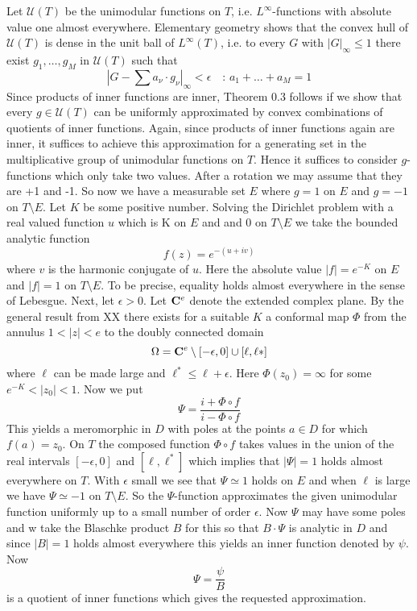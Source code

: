 \documentclass{amsart}
\def\vvv{-}
\begin{document}
\noindent
Let $\mathcal{U}(T)$
be the unimodular functions on $T$, i.e.
$L^\infty$-functions with absolute value one almost
everywhere.
Elementary geometry shows that the convex hull of
$\mathcal U(T)$ is dense in the unit ball of
$L^\infty(T)$, i.e. to every $G$ with
$|G|_\infty\leq 1$ there exist
$g_1,\ldots,g_M$ in $\mathcal{U}(T)$
such that
\[ 
|G-\sum a_\nu\cdot g_\nu|_\infty<\epsilon\quad\colon\, a_1+\ldots+a_M=1\tag{*}
\]
Since products of inner functions are inner, 
Theorem 0.3 follows if we  show that
every $g\in\mathcal{U}(T)$
can be uniformly approximated
by convex combinations of quotients of inner functions.
Again, since products of inner functions again are inner, it suffices to
achieve this approximation for a generating set in the
multiplicative group of  unimodular functions on $T$.
Hence it suffices to consider $g$-functions which only take two values. 
After a rotation
we may assume that they are +1 and -1. So now we have a measurable set
$E$ where $g=1$ on $E$ and $g=-1$ on $T\setminus E$.
Let $K$ be some positive number.
Solving the Dirichlet problem with a real valued function
$u$ which is K on $E$ and and 0 on $T\setminus E$
we take the bounded analytic function
\[ 
f(z)=e^{\vvv (u+iv)}
\]
where $v$ is the harmonic conjugate of $u$.
Here the absolute value $|f|=e^{\vvv K}$ on $E$ and $|f|=1$ on $T\setminus E$.
To be precise, equality holds almost everywhere in the
sense of Lebesgue.
Next, let $\epsilon>0$. Let ${\bf{C}}^e$
denote the extended complex plane. 
By the general result from XX
there exists for a suitable $K$
a conformal map
$\Phi$ from the annulus $1<|z|<e$
to the doubly connected domain
\[ 
\Omega={\bf{C}}^e\setminus [\vvv \epsilon,0]\cup
[\ell,\ell*]
\] 
where 
$\ell$ can be made large and $\ell^*\leq \ell+\epsilon$.
Here $\Phi(z_0)=\infty $  for some
$e^{\vvv K}<|z_0|<1$. Now we put
\[
\Psi=\frac{i+\Phi\circ f}{i\vvv\Phi\circ f}
\]
This yields a  meromorphic in $D$ with poles at the points $a\in D$ for which
$f(a)=z_0$.
On 
$T$ the composed function $\Phi\circ f$
takes values in the union of the real intervals
$[\vvv \epsilon,0]$ and $[\ell,\ell^*]$ which implies that
$|\Psi|=1$ holds almost everywhere on $T$.
With $\epsilon$ small we see that
$\Psi\simeq 1$ holds on
$E$ and when $\ell$ is large we have
$\Psi\simeq \vvv 1$ on $T\setminus E$.
So the $\Psi$\vvv function approximates the given unimodular 
function uniformly up to a small number of order $\epsilon$.
Now $\Psi$ may have some poles and w take the Blaschke product $B$ for this so that
$B\cdot \Psi$ is analytic in $D$ and since $|B|=1$ holds almost
everywhere this yields an inner function denoted by $\psi$.
Now
\[ 
\Psi=\frac{\psi}{B}
\]
is a quotient of inner functions which
gives the requested approximation.
\end{document}
